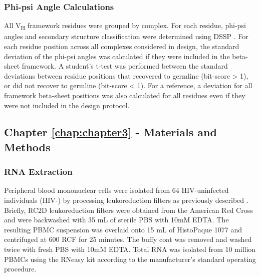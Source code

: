 \subsubsection{Phi-psi Angle Calculations}
All V\textsubscript{H} framework residues were grouped by complex. For each residue, phi-psi angles and secondary structure classification were determined using DSSP \citep{Kabsch:1983bp}. For each residue position across all complexes considered in design, the standard deviation of the phi-psi angles was calculated if they were included in the beta-sheet framework. A student's t-test was performed between the standard deviations between residue positions that recovered to germline (bit-score > 1), or did not recover to germline (bit-score < 1). For a reference, a deviation for all framework beta-sheet positions was also calculated for all residues even if they were not included in the design protocol.
\clearpage
\subsection{Chapter \ref{chap:chapter3} - Materials and Methods}
\par\vspace{10pt}
\subsubsection{RNA Extraction}
Peripheral blood mononuclear cells were isolated from 64 HIV-uninfected individuals (HIV-\naive) by processing leukoreduction filters as previously described \citep{Weitkamp:2001vm}. Briefly, RC2D leukoreduction filters were obtained from the American Red Cross and were backwashed with 35 mL of sterile PBS with 10mM EDTA. The resulting PBMC suspension was overlaid onto 15 mL of HistoPaque 1077 and centrifuged at 600 RCF for 25 minutes. The buffy coat was removed and washed twice with fresh PBS with 10mM EDTA. Total RNA was isolated from 10 million PBMCs using the RNeasy kit according to the manufacturer's standard operating procedure.


